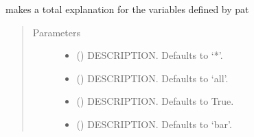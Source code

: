 \documentclass[letterpaper,10pt,english]{sphinxmanual}
\begin{document}
\begin{fulllineitems}
\begin{fulllineitems}
\label{\detokenize{index:modelclass.Dekomp_Mixin.totexplain}}
\pysigstartsignatures
{}
\pysigstopsignatures
\sphinxAtStartPar
makes a total explanation for the variables defined by pat
\begin{quote}\begin{description}
\item[{Parameters}] \leavevmode\begin{itemize}
\item {} 
\sphinxAtStartPar
{} (\sphinxstyleliteralemphasis{\sphinxupquote{, }}) \textendash{} DESCRIPTION. Defaults to ‘*’.

\item {} 
\sphinxAtStartPar
{} (\sphinxstyleliteralemphasis{\sphinxupquote{, }}) \textendash{} DESCRIPTION. Defaults to ‘all’.

\item {} 
\sphinxAtStartPar
{} (\sphinxstyleliteralemphasis{\sphinxupquote{, }}) \textendash{} DESCRIPTION. Defaults to True.

\item {} 
\sphinxAtStartPar
{} (\sphinxstyleliteralemphasis{\sphinxupquote{, }}) \textendash{} DESCRIPTION. Defaults to ‘bar’.


\end{itemize}
\end{description}
\end{quote}
\end{fulllineitems}
\end{fulllineitems}
\end{document}
